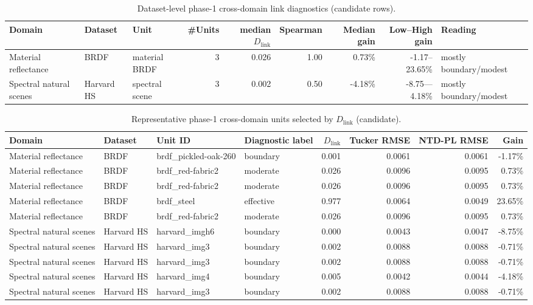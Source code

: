 
\begin{table}[t]
\centering
\caption{Dataset-level phase-1 cross-domain link diagnostics (candidate rows).}
\begin{tabular}{@{}l l l r r r r r l@{}}
\toprule
Domain & Dataset & Unit & \#Units & median $D_{\mathrm{link}}$ & Spearman & Median gain & Low--High gain & Reading \\
\midrule
Material reflectance & BRDF & material BRDF & 3 & 0.026 & 1.00 & 0.73\% & -1.17--23.65\% & mostly boundary/modest \\
Spectral natural scenes & Harvard HS & spectral scene & 3 & 0.002 & 0.50 & -4.18\% & -8.75---4.18\% & mostly boundary/modest \\
\bottomrule
\end{tabular}
\end{table}

\begin{table}[t]
\centering
\caption{Representative phase-1 cross-domain units selected by $D_{\mathrm{link}}$ (candidate).}
\begin{tabular}{@{}l l l l r r r r@{}}
\toprule
Domain & Dataset & Unit ID & Diagnostic label & $D_{\mathrm{link}}$ & Tucker RMSE & NTD-PL RMSE & Gain \\
\midrule
Material reflectance & BRDF & brdf_pickled-oak-260 & boundary & 0.001 & 0.0061 & 0.0061 & -1.17\% \\
Material reflectance & BRDF & brdf_red-fabric2 & moderate & 0.026 & 0.0096 & 0.0095 & 0.73\% \\
Material reflectance & BRDF & brdf_red-fabric2 & moderate & 0.026 & 0.0096 & 0.0095 & 0.73\% \\
Material reflectance & BRDF & brdf_steel & effective & 0.977 & 0.0064 & 0.0049 & 23.65\% \\
Material reflectance & BRDF & brdf_red-fabric2 & moderate & 0.026 & 0.0096 & 0.0095 & 0.73\% \\
Spectral natural scenes & Harvard HS & harvard_imgh6 & boundary & 0.000 & 0.0043 & 0.0047 & -8.75\% \\
Spectral natural scenes & Harvard HS & harvard_img3 & boundary & 0.002 & 0.0088 & 0.0088 & -0.71\% \\
Spectral natural scenes & Harvard HS & harvard_img3 & boundary & 0.002 & 0.0088 & 0.0088 & -0.71\% \\
Spectral natural scenes & Harvard HS & harvard_img4 & boundary & 0.005 & 0.0042 & 0.0044 & -4.18\% \\
Spectral natural scenes & Harvard HS & harvard_img3 & boundary & 0.002 & 0.0088 & 0.0088 & -0.71\% \\
\bottomrule
\end{tabular}
\end{table}
